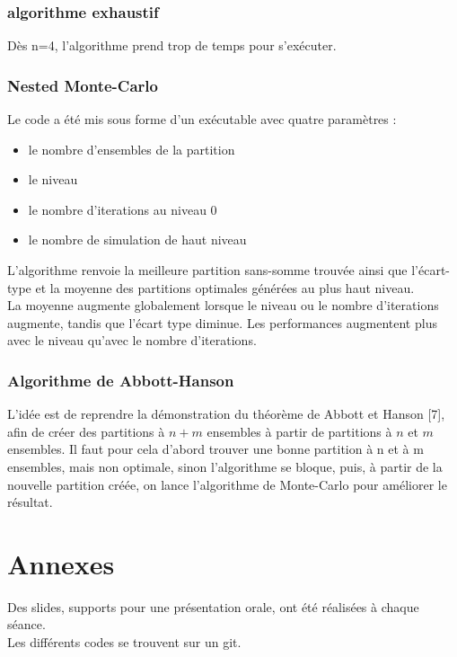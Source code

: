 \documentclass{report}
\begin{document}
\subsubsection{algorithme exhaustif}
Dès n=4, l'algorithme prend trop de temps pour s'exécuter.
\subsubsection{Nested Monte-Carlo}
Le code a été mis sous forme d'un exécutable avec quatre paramètres : 
\begin{itemize}
    \item le nombre d'ensembles de la partition
    \item le niveau
    \item le nombre d’iterations au niveau 0
    \item le nombre de simulation de haut niveau
\end{itemize}
 L'algorithme renvoie la meilleure partition sans-somme trouvée ainsi que l'écart-type et la moyenne des partitions optimales générées au plus haut niveau. 
 \\ La moyenne augmente globalement lorsque le niveau ou le nombre d’iterations augmente, tandis que l'écart type diminue. Les performances augmentent plus avec le niveau qu'avec le nombre d’iterations.
\subsubsection{Algorithme de Abbott-Hanson}
L'idée est de reprendre la démonstration du théorème de Abbott et Hanson [7], afin de créer des partitions à $n+m$ ensembles à partir de partitions à $n$ et $m$ ensembles. Il faut pour cela d'abord trouver une bonne partition à n et à m ensembles, mais non optimale, sinon l'algorithme se bloque, puis, à partir de la nouvelle partition créée, on lance l'algorithme de Monte-Carlo pour améliorer le résultat.

\section{Annexes}
Des slides, supports pour une présentation orale, ont été réalisées à chaque séance.
\\ Les différents codes se trouvent sur un git.
\end{document}
